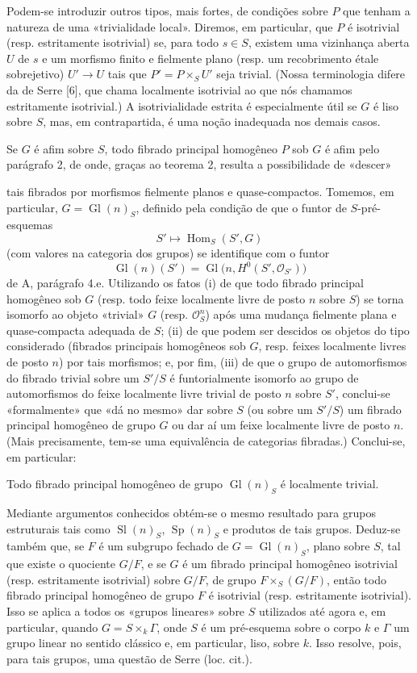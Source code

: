 Podem-se introduzir outros tipos, mais fortes, de condições sobre $P$ que
tenham a natureza de uma «trivialidade local». Diremos, em particular, que
$P$ é isotrivial (resp. estritamente isotrivial) se, para todo $s\in S$,
existem uma vizinhança aberta $U$ de $s$ e um morfismo finito e fielmente plano
(resp. um recobrimento étale sobrejetivo) $U'\longrightarrow U$ tais que
$P'=P\times_SU'$ seja trivial. (Nossa terminologia difere da de Serre [6], que
chama localmente isotrivial ao que nós chamamos estritamente isotrivial.) A
isotrivialidade estrita é especialmente útil se $G$ é liso sobre $S$, mas, em
contrapartida, é uma noção inadequada nos demais casos.

Se $G$ é afim sobre $S$, todo fibrado principal homogêneo $P$ sob $G$ é afim
pelo parágrafo 2, de onde, graças ao teorema 2, resulta a possibilidade de
«descer»

tais fibrados por morfismos fielmente planos e quase-compactos. Tomemos, em
particular, $G=\operatorname{Gl}(n)_S$, definido pela condição de que o
funtor de $S$-pré-esquemas
\[
  S'\longmapsto\operatorname{Hom}_S(S',G)
\]
(com valores na categoria dos grupos) se identifique com o funtor
\[
  \operatorname{Gl}(n)(S')
  =\operatorname{Gl}\bigl(n,H^0(S',\mathcal O_{S'})\bigr)
\]
de A, parágrafo 4.e. Utilizando os fatos (i) de que todo fibrado principal
homogêneo sob $G$ (resp. todo feixe localmente livre de posto $n$ sobre $S$) se
torna isomorfo ao objeto «trivial» $G$ (resp. $\mathcal O_S^n$) após uma mudança
fielmente plana e quase-compacta adequada de $S$; (ii) de que podem ser descidos
os objetos do tipo considerado (fibrados principais homogêneos sob $G$,
resp. feixes localmente livres de posto $n$) por tais morfismos; e, por fim,
(iii) de que o grupo de automorfismos do fibrado trivial sobre um $S'/S$ é
funtorialmente isomorfo ao grupo de automorfismos do feixe localmente livre
trivial de posto $n$ sobre $S'$, conclui-se «formalmente» que «dá no mesmo»
dar sobre $S$ (ou sobre um $S'/S$) um fibrado principal homogêneo de grupo $G$
ou dar aí um feixe localmente livre de posto $n$. (Mais precisamente, tem-se
uma equivalência de categorias fibradas.) Conclui-se, em particular:

 Todo fibrado principal homogêneo de grupo
$\operatorname{Gl}(n)_S$ é localmente trivial.

Mediante argumentos conhecidos obtém-se o mesmo resultado para grupos
estruturais tais como $\operatorname{Sl}(n)_S$, $\operatorname{Sp}(n)_S$ e
produtos de tais grupos. Deduz-se também que, se $F$ é um subgrupo fechado
de $G=\operatorname{Gl}(n)_S$, plano sobre $S$, tal que existe o quociente
$G/F$, e se $G$ é um fibrado principal homogêneo isotrivial (resp.
estritamente isotrivial) sobre $G/F$, de grupo $F\times_S(G/F)$, então todo
fibrado principal homogêneo de grupo $F$ é isotrivial (resp. estritamente
isotrivial). Isso se aplica a todos os «grupos lineares» sobre $S$ utilizados
até agora e, em particular, quando $G=S\times_k\Gamma$, onde $S$ é um
pré-esquema sobre o corpo $k$ e $\Gamma$ um grupo linear no sentido clássico
e, em particular, liso, sobre $k$. Isso resolve, pois, para tais grupos, uma
questão de Serre (loc. cit.).

